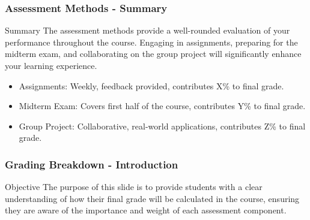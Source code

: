 \documentclass[aspectratio=169]{beamer}
\begin{document}
\begin{frame}[fragile]
    \frametitle{Assessment Methods - Summary}
    \begin{block}{Summary}
        The assessment methods provide a well-rounded evaluation of your performance throughout the course. Engaging in assignments, preparing for the midterm exam, and collaborating on the group project will significantly enhance your learning experience.
    \end{block}
    
    \begin{itemize}
        \item Assignments: Weekly, feedback provided, contributes X\% to final grade.
        \item Midterm Exam: Covers first half of the course, contributes Y\% to final grade.
        \item Group Project: Collaborative, real-world applications, contributes Z\% to final grade.
    \end{itemize}
\end{frame}

\begin{frame}[fragile]
    \frametitle{Grading Breakdown - Introduction}
    \begin{block}{Objective}
        The purpose of this slide is to provide students with a clear understanding of how their final grade will be calculated in the course, ensuring they are aware of the importance and weight of each assessment component.
    \end{block}
\end{frame}
\end{document}
